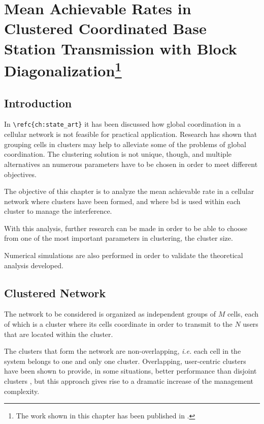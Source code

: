 \chapter[Achievable Rates]{Mean Achievable Rates in Clustered Coordinated Base
Station Transmission with Block Diagonalization\footnote{
    The work shown in this chapter has been published in \cite{corvaja13b}.
}} \label{ch:achiev_rates}

\section{Introduction}\label{sec:achiev_introduction}

In \verb+\refc{ch:state_art}+ it has been discussed how global coordination in a
cellular network is not feasible for practical application. Research has shown
that grouping cells in clusters may help to alleviate some of the problems of
global coordination. The clustering solution is not unique, though, and multiple
alternatives an numerous parameters have to be chosen in order to meet different
objectives.

The objective of this chapter is to analyze the mean achievable rate in a cellular network where clusters have been formed, and where \gls{bd} is used within
each cluster to manage the interference. 

With this analysis, further research can be made in order to be able to choose
from one of the most important parameters in clustering, the cluster size.

Numerical simulations are also performed in order to validate the theoretical
analysis developed.

\section{Clustered Network}\label{sec:achiev_clust_net}

The network to be considered is organized as independent groups of $M$ cells,
each of which is a cluster where its cells coordinate in order to transmit to
the $N$ users that are located within the cluster.

The clusters that form the network are non-overlapping, \emph{i.e.} each cell in
the system belongs to one and only one cluster. Overlapping, user-centric
clusters have been shown to provide, in some situations, better performance than
disjoint clusters \cite{bjornson11}, but this approach gives rise to a dramatic
increase of the management complexity.


